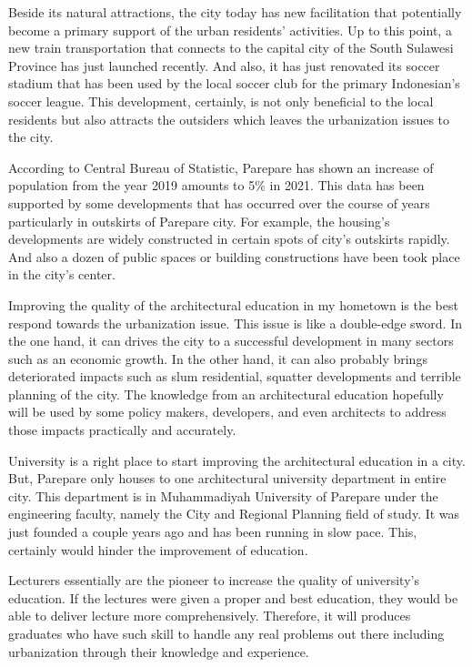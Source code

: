 \documentclass[../main.tex]{subfiles}
\begin{document}
Beside its natural attractions, the city today has new facilitation that potentially become a primary support of the urban residents' activities.
Up to this point, a new train transportation that connects to the capital city of the South Sulawesi Province has just launched recently.
And also, it has just renovated its soccer stadium that has been used by the local soccer club for the primary Indonesian's soccer league.
This development, certainly, is not only beneficial to the local residents but also attracts the outsiders which leaves the urbanization issues to the city.

According to Central Bureau of Statistic, Parepare has shown an increase of population from the year 2019 amounts to 5\% in 2021. This data has been supported by some developments that has occurred over the course of years particularly in outskirts of Parepare city. For example, the housing's developments are widely constructed in certain spots of city's outskirts rapidly. And also a dozen of public spaces or building constructions have been took place in the city's center.

Improving the quality of the architectural education in my hometown is the best respond towards the urbanization issue.
This issue is like a double-edge sword. In the one hand, it can drives the city to a successful development in many sectors such as an economic growth. In the other hand, it can also probably brings deteriorated impacts such as slum residential, squatter developments and terrible planning of the city. The knowledge from an architectural education hopefully will be used by some policy makers, developers, and even architects to address those impacts practically and accurately.

University is a right place to start improving the architectural education in a city.
But, Parepare only houses to one architectural university department in entire city.
This department is in Muhammadiyah University of Parepare under the engineering faculty, namely the City and Regional Planning field of study.
It was just founded a couple years ago and has been running in slow pace. This, certainly would hinder the improvement of education.

Lecturers essentially are the pioneer to increase the quality of university's education.
If the lectures were given a proper and best education, they would be able to deliver lecture more comprehensively.
Therefore, it will produces graduates who have such skill to handle any real problems out there including urbanization through their knowledge and experience.
\end{document}
